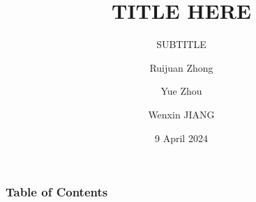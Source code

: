 \documentclass{beamer}
\title[GLM Net] %
{TITLE HERE}
\subtitle{SUBTITLE}
\author[] %
{Ruijuan Zhong \and Yue Zhou \and Wenxin JIANG} %
\institute[BIOS] %
{
  Department of Biostatistics\\
  City University of Hong Kong
}
\date[April 2024] %
{9 April 2024}
\begin{document}
\frame{\titlepage}


\begin{frame}
\frametitle{Table of Contents}
\tableofcontents
\end{frame}







\end{document}
